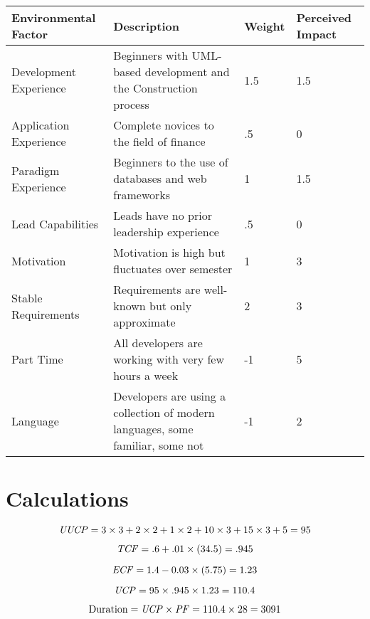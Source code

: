 \renewcommand\arraystretch{2}
\begin{longtable}{|p{1.2in}|p{3.6in}|p{0.5in}|p{.7in}|}
\hline
{\large \color{color1}Environmental Factor}&{\large \color{color1}Description}&{\large \color{color1}Weight}&{\large \color{color1}Perceived Impact} \\ \hline
Development Experience & Beginners with UML-based development and the Construction process & 1.5 & 1.5 \\ \hline
Application Experience & Complete novices to the field of finance & .5 & 0 \\ \hline
Paradigm Experience & Beginners to the use of databases and web
frameworks & 1 & 1.5 \\ \hline
Lead Capabilities & Leads have no prior leadership experience
& .5 & 0 \\ \hline
Motivation & Motivation is high but fluctuates over semester & 1 & 3 \\ \hline
Stable Requirements & Requirements are well-known but only approximate & 2 & 3 \\ \hline
Part Time & All developers are working with very few hours a week & -1 & 5 \\ \hline
Language & Developers are using a collection of modern languages, some familiar, some not & -1 & 2 \\ \hline
\end{longtable}

\section{Calculations}

$$ \mathit{UUCP} = 3\times 3 + 2\times 2 + 1\times 2 + 10 \times 3 + 15 \times 3 + 5 = 95 $$

$$ \mathit{TCF} = .6 + .01 \times (34.5) = .945 $$

$$ \mathit{ECF} = 1.4 -0.03 \times (5.75) = 1.23 $$

$$ \mathit{UCP} = 95 \times .945 \times 1.23 = 110.4 $$

$$ \mbox{Duration} = \mathit{UCP} \times \mathit{PF} = 110.4 \times 28 = 3091 $$
